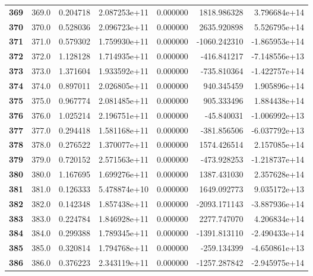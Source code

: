 \documentclass{report}[12pt]
\begin{document}
\begin{center}
\begin{tabular}{lrrrrrr}
\textbf{369 } &          369.0 &   0.204718 &  2.087253e+11 &    0.000000 &  1818.986328 &  3.796684e+14 \\
\textbf{370 } &          370.0 &   0.528036 &  2.096723e+11 &    0.000000 &  2635.920898 &  5.526795e+14 \\
\textbf{371 } &          371.0 &   0.579302 &  1.759930e+11 &    0.000000 & -1060.242310 & -1.865953e+14 \\
\textbf{372 } &          372.0 &   1.128128 &  1.714935e+11 &    0.000000 &  -416.841217 & -7.148556e+13 \\
\textbf{373 } &          373.0 &   1.371604 &  1.933592e+11 &    0.000000 &  -735.810364 & -1.422757e+14 \\
\textbf{374 } &          374.0 &   0.897011 &  2.026805e+11 &    0.000000 &   940.345459 &  1.905896e+14 \\
\textbf{375 } &          375.0 &   0.967774 &  2.081485e+11 &    0.000000 &   905.333496 &  1.884438e+14 \\
\textbf{376 } &          376.0 &   1.025214 &  2.196751e+11 &    0.000000 &   -45.840031 & -1.006992e+13 \\
\textbf{377 } &          377.0 &   0.294418 &  1.581168e+11 &    0.000000 &  -381.856506 & -6.037792e+13 \\
\textbf{378 } &          378.0 &   0.276522 &  1.370077e+11 &    0.000000 &  1574.426514 &  2.157085e+14 \\
\textbf{379 } &          379.0 &   0.720152 &  2.571563e+11 &    0.000000 &  -473.928253 & -1.218737e+14 \\
\textbf{380 } &          380.0 &   1.167695 &  1.699276e+11 &    0.000000 &  1387.431030 &  2.357628e+14 \\
\textbf{381 } &          381.0 &   0.126333 &  5.478874e+10 &    0.000000 &  1649.092773 &  9.035172e+13 \\
\textbf{382 } &          382.0 &   0.142348 &  1.857438e+11 &    0.000000 & -2093.171143 & -3.887936e+14 \\
\textbf{383 } &          383.0 &   0.224784 &  1.846928e+11 &    0.000000 &  2277.747070 &  4.206834e+14 \\
\textbf{384 } &          384.0 &   0.299388 &  1.789345e+11 &    0.000000 & -1391.813110 & -2.490433e+14 \\
\textbf{385 } &          385.0 &   0.320814 &  1.794768e+11 &    0.000000 &  -259.134399 & -4.650861e+13 \\
\textbf{386 } &          386.0 &   0.376223 &  2.343119e+11 &    0.000000 & -1257.287842 & -2.945975e+14 \\

\end{tabular}
\end{center}
\end{document}
